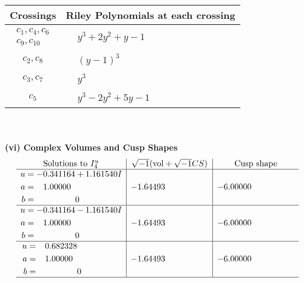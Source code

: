 \documentclass[1p]{elsarticle_modified}
\theoremstyle{definition}
\newcommand{\I}{\sqrt{-1}}
\begin{document}
\begin{tabular}{m{50pt}|m{274pt}}
Crossings & \hspace{64pt}Riley Polynomials at each crossing \\
\hline $$\begin{aligned}c_{1},c_{4},c_{6}\\c_{9},c_{10}\end{aligned}$$&$\begin{aligned}
&y^3+2 y^2+y-1
\end{aligned}$\\
\hline $$\begin{aligned}c_{2},c_{8}\end{aligned}$$&$\begin{aligned}
&(y-1)^3
\end{aligned}$\\
\hline $$\begin{aligned}c_{3},c_{7}\end{aligned}$$&$\begin{aligned}
&y^3
\end{aligned}$\\
\hline $$\begin{aligned}c_{5}\end{aligned}$$&$\begin{aligned}
&y^3-2 y^2+5 y-1
\end{aligned}$\\
\hline
\end{tabular}\\~\\
\newpage\flushleft \textbf{(vi) Complex Volumes and Cusp Shapes}
$$\begin{array}{c|c|c}  
\text{Solutions to }I^u_{4}& \I (\text{vol} + \sqrt{-1}CS) & \text{Cusp shape}\\
 \hline 
\begin{aligned}
u &= -0.341164 + 1.161540 I \\
a &= \phantom{-}1.00000\phantom{ +0.000000I} \\
b &= \phantom{-0.000000 } 0\end{aligned}
 & -1.64493\phantom{ +0.000000I} & -6.00000\phantom{ +0.000000I} \\ \hline\begin{aligned}
u &= -0.341164 - 1.161540 I \\
a &= \phantom{-}1.00000\phantom{ +0.000000I} \\
b &= \phantom{-0.000000 } 0\end{aligned}
 & -1.64493\phantom{ +0.000000I} & -6.00000\phantom{ +0.000000I} \\ \hline\begin{aligned}
u &= \phantom{-}0.682328\phantom{ +0.000000I} \\
a &= \phantom{-}1.00000\phantom{ +0.000000I} \\
b &= \phantom{-0.000000 } 0\end{aligned}
 & -1.64493\phantom{ +0.000000I} & -6.00000\phantom{ +0.000000I}\\
 \hline 
 \end{array}$$\newpage\newpage\renewcommand{\arraystretch}{1}
\end{document}
